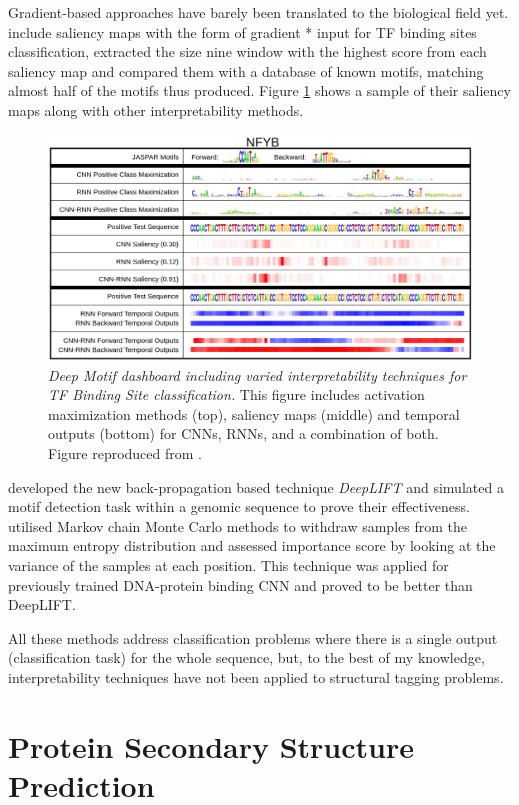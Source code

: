 Gradient-based approaches have barely been translated to the biological field yet. \cite{Lanchantin2016} include saliency maps with the form of gradient * input for TF binding sites classification, extracted the size nine window with the highest score from each saliency map and compared them with a database of known motifs, matching almost half of the motifs thus produced. Figure \ref{fig:demo} shows a sample of their saliency maps along with other interpretability methods.

\begin{figure}
	\centering
	\includegraphics[width=0.8\linewidth]{Figures/demo}
	\caption{\textit{Deep Motif dashboard including varied interpretability techniques for TF Binding Site classification.} This figure includes activation maximization methods (top), saliency maps (middle) and temporal outputs (bottom) for CNNs, RNNs, and a combination of both. Figure reproduced from \cite{Lanchantin2016}.}
	\label{fig:demo}
\end{figure}

\cite{Shrikumar2017} developed the new back-propagation based technique \textit{DeepLIFT} and simulated a motif detection task within a genomic sequence to prove their effectiveness. \cite{Finnegan2017} utilised Markov chain Monte Carlo methods to withdraw samples from the maximum entropy distribution and assessed importance score by looking at the variance of the samples at each position. This technique was applied for previously trained DNA-protein binding CNN and proved to be better than DeepLIFT.

All these methods address classification problems where there is a single output (classification task) for the whole sequence, but, to the best of my knowledge, interpretability techniques have not been applied to structural tagging problems.


\section{Protein Secondary Structure Prediction}


